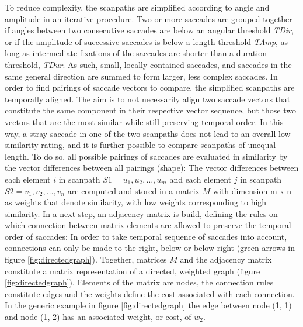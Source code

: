 \documentclass[a4paper, 12pt]{scrreprt}
\begin{document}
{To reduce complexity, the scanpaths are simplified according to angle and amplitude in an iterative procedure. Two or more saccades are grouped together if angles between two consecutive saccades are below an angular threshold \textit{TDir}, or if the amplitude of successive saccades is below a length threshold \textit{TAmp}, as long as intermediate fixations of the saccades are shorter than a duration threshold, \textit{TDur}. As such, small, locally contained saccades, and saccades in the same general direction are summed to form larger, less complex saccades. \newline
In order to find pairings of saccade vectors to compare, the simplified scanpaths are temporally aligned. The aim is to not necessarily align two saccade vectors that constitute the same component in  their respective vector sequence, but those two vectors that are the most similar while still preserving temporal order. In this way, a stray saccade in one of the two scanpaths does not lead to an overall low similarity rating, and it is further possible to compare scanpaths of unequal length.  To do so, all possible pairings of saccades are evaluated in similarity by the vector differences between all pairings (shape): The vector differences between each element $i$ in scanpath $S1 = {u_1, u_2, \ldots, u_m}$ and each element $j$ in scanpath $S2 = {v_1, v_2, \ldots, v_n}$ are computed and stored in a matrix $M$ with dimension m x n as weights that denote similarity, with low weights corresponding to high similarity. In a next step, an adjacency matrix is build, defining the rules on which connection between matrix elements are allowed to preserve the temporal order of saccades: In order to take temporal sequence of saccades into account, connections can only be made to the right, below or below-right (green arrows in figure \ref{fig:directedgraph}). Together, matrices $M$ and the adjacency matrix constitute a matrix representation of a directed, weighted graph (figure \ref{fig:directedgraph}). Elements of the matrix are nodes, the connection rules constitute edges and the weights define the cost associated with each connection. 
In the generic example in figure \ref{fig:directedgraph} the edge between node (1, 1) and node (1, 2) has an associated weight, or cost, of $w_2$. 


}
\end{document}
